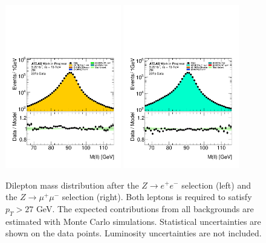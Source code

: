 \begin{figure}[htbp]
\centering
\includegraphics[width=0.45\textwidth]{figures/ZR/dataMc-dilep_m-ZR-el-log.pdf}
\includegraphics[width=0.45\textwidth]{figures/ZR/dataMc-dilep_m-ZR-mu-log.pdf}
\caption{
Dilepton mass distribution after the $Z \rightarrow e^+e^-$ selection (left) and the $Z \rightarrow \mu^+\mu^-$  selection (right).
Both leptons is required to satisfy $p_T > 27$ GeV.
The expected contributions from all backgrounds are estimated with Monte Carlo simulations.
Statistical uncertainties are shown on the data points.
Luminosity uncertainties are not included.
}
\label{fig:ZR_dilep_m_log}
\end{figure}

